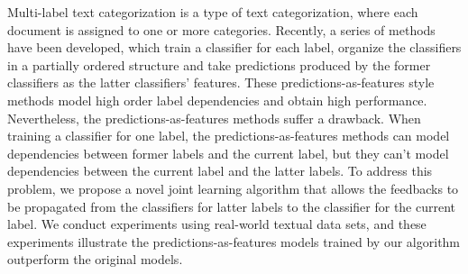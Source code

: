Multi-label text categorization is a type of text categorization, where each document is assigned to one or more categories. Recently, a series of methods have been developed, which train a classifier for each label, organize the classifiers in a partially ordered structure and take predictions produced by the former classifiers as the latter classifiers' features. These predictions-as-features style methods model high order label dependencies and obtain high performance. Nevertheless, the predictions-as-features methods suffer a drawback. When training a classifier for one label, the predictions-as-features methods can model dependencies between former labels and the current label, but they can't model dependencies between the current label and the latter labels. To address this problem, we propose a novel joint learning algorithm that allows the feedbacks to be propagated from the classifiers for latter labels to the classifier for the current label. We conduct experiments using real-world textual data sets, and these experiments illustrate the predictions-as-features models trained by our algorithm outperform the original models.
